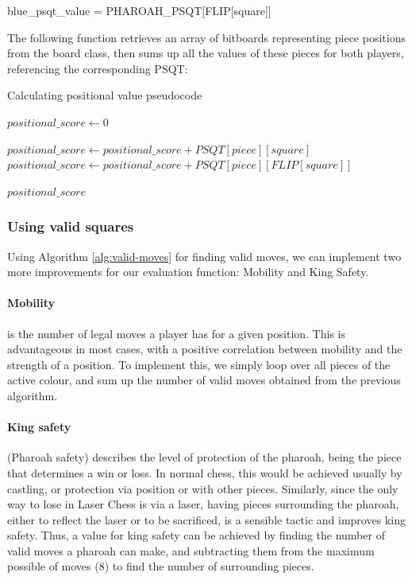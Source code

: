 \documentclass[../main/main.tex]{subfiles}
\begin{document}
\begin{center}
blue\_psqt\_value = PHAROAH\_PSQT[FLIP[square]]
\end{center}

The following function retrieves an array of bitboards representing piece positions from the board class, then sums up all the values of these pieces for both players, referencing the corresponding PSQT:

\begin{algorithm}[H]
\caption{Calculating positional value pseudocode}
\begin{algorithmic}
    \State $positional\_score \gets 0$

                    \State $positional\_score \gets positional\_score + PSQT[piece][square]$
                \Else
                    \State $positional\_score \gets positional\_score + PSQT[piece][FLIP[square]]$
                \EndIf
            \EndIf
        \EndFor
    \EndFor

    \State \Return $positional\_score$
    \EndFunction
\end{algorithmic}
\end{algorithm}

\subsubsection*{Using valid squares}
Using Algorithm \ref{alg:valid-moves} for finding valid moves, we can implement two more improvements for our evaluation function: Mobility and King Safety.

\paragraph{Mobility} is the number of legal moves a player has for a given position. This is advantageous in most cases, with a positive correlation between mobility and the strength of a position. To implement this, we simply loop over all pieces of the active colour, and sum up the number of valid moves obtained from the previous algorithm.

\paragraph{King safety} (Pharoah safety) describes the level of protection of the pharoah, being the piece that determines a win or loss. In normal chess, this would be achieved usually by castling, or protection via position or with other pieces. Similarly, since the only way to lose in Laser Chess is via a laser, having pieces surrounding the pharoah, either to reflect the laser or to be sacrificed, is a sensible tactic and improves king safety. Thus, a value for king safety can be achieved by finding the number of valid moves a pharoah can make, and subtracting them from the maximum possible of moves (8) to find the number of surrounding pieces.
\end{document}
